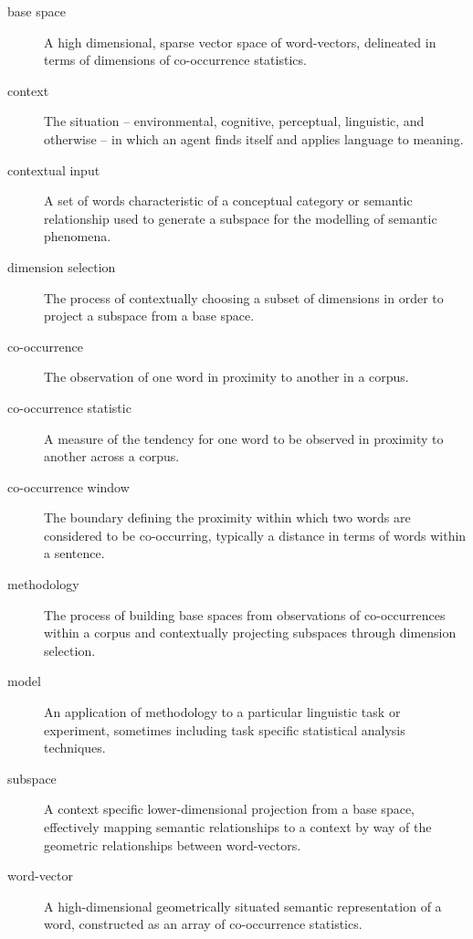 




\begin{glossary}
\begin{description}
\item[base space] A high dimensional, sparse vector space of word-vectors, delineated in terms of dimensions of co-occurrence statistics.
\item[context] The situation -- environmental, cognitive, perceptual, linguistic, and otherwise -- in which an agent finds itself and applies language to meaning.
\item[contextual input] A set of words characteristic of a conceptual category or semantic relationship used to generate a subspace for the modelling of semantic phenomena.
\item[dimension selection] The process of contextually choosing a subset of dimensions in order to project a subspace from a base space.
\item[co-occurrence] The observation of one word in proximity to another in a corpus.
\item[co-occurrence statistic] A measure of the tendency for one word to be observed in proximity to another across a corpus.
\item[co-occurrence window] The boundary defining the proximity within which two words are considered to be co-occurring, typically a distance in terms of words within a sentence.
\item[methodology] The process of building base spaces from observations of co-occurrences within a corpus and contextually projecting subspaces through dimension selection.
\item[model] An application of methodology to a particular linguistic task or experiment, sometimes including task specific statistical analysis techniques.
\item [subspace] A context specific lower-dimensional projection from a base space, effectively mapping semantic relationships to a context by way of the geometric relationships between word-vectors.
\item[word-vector] A high-dimensional geometrically situated semantic representation of a word, constructed as an array of co-occurrence statistics.
\end{description}
\end{glossary}
